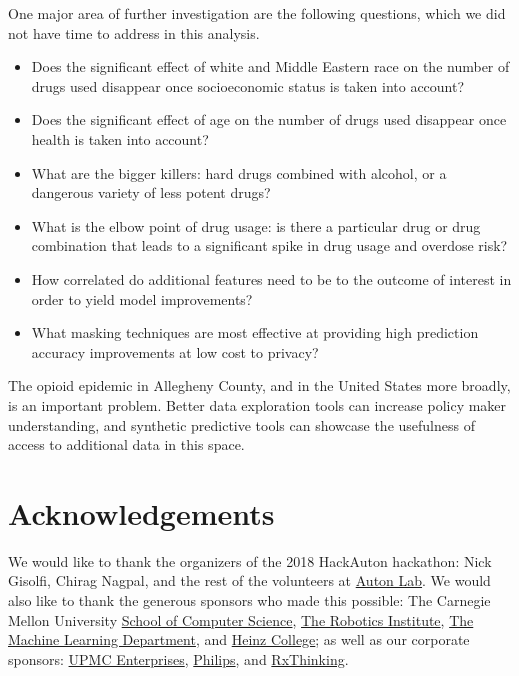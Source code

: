 \documentclass{article}
\begin{document}
One major area of further investigation are the following questions, which we did not have time to address in this analysis.
\begin{itemize}
\item Does the significant effect of white and Middle Eastern race on the number of drugs used disappear once socioeconomic status is taken into account?
\item Does the significant effect of age on the number of drugs used disappear once health is taken into account?
\item What are the bigger killers: hard drugs combined with alcohol, or a dangerous variety of less potent drugs?
\item What is the elbow point of drug usage: is there a particular drug or drug combination that leads to a significant spike in drug usage and overdose risk?
\item How correlated do additional features need to be to the outcome of interest in order to yield model improvements?
\item What masking techniques are most effective at providing high prediction accuracy improvements at low cost to privacy?
\end{itemize}

The opioid epidemic in Allegheny County, and in the United States more broadly, is an important problem. Better data exploration tools can increase policy maker understanding, and synthetic predictive tools can showcase the usefulness of access to additional data in this space.

\section*{Acknowledgements}

We would like to thank the organizers of the 2018 HackAuton hackathon: Nick Gisolfi, Chirag Nagpal, and the rest of the volunteers at \href{https://www.autonlab.org/}{Auton Lab}. We would also like to thank the generous sponsors who made this possible: The Carnegie Mellon University \href{https://www.cs.cmu.edu/}{School of Computer Science}, \href{https://www.ri.cmu.edu/}{The Robotics Institute}, \href{https://www.ml.cmu.edu/}{The Machine Learning Department}, and \href{https://www.heinz.cmu.edu/}{Heinz College}; as well as our corporate sponsors: \href{http://enterprises.upmc.com/}{UPMC Enterprises}, \href{https://www.usa.philips.com/}{Philips}, and \href{https://rxthinking.com/}{RxThinking}.


\nocite{*}

\end{document}
